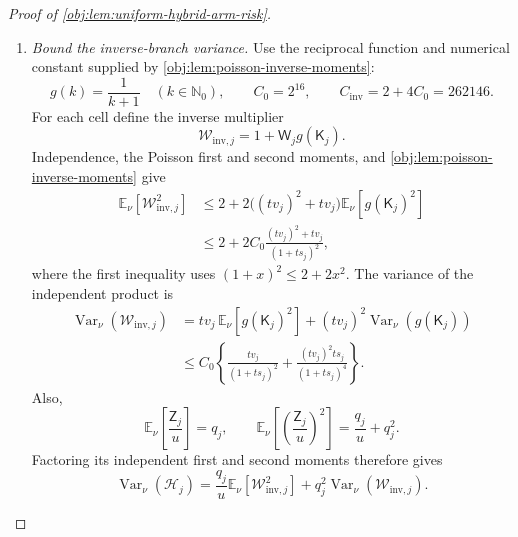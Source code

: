 \documentclass[11pt]{article}
\begin{document}
\begin{proof}[Proof of \cref{obj:lem:uniform-hybrid-arm-risk}]
\begin{enumerate}
\item \textit{Bound the inverse-branch variance.}
Use the reciprocal function and numerical constant supplied by
\cref{obj:lem:poisson-inverse-moments}:
\[
g(k)=\frac1{k+1}\quad(k\in\mathbb N_0),
\qquad
C_0=2^{16},
\qquad
C_{\mathrm{inv}}=2+4C_0=262146.
\]
For each cell define the inverse multiplier
\[
\mathcal W_{\mathrm{inv},j}
=1+\mathsf W_jg(\mathsf K_j).
\]
Independence, the Poisson first and second moments, and
\cref{obj:lem:poisson-inverse-moments} give
\[
\begin{aligned}
\mathbb E_\nu[\mathcal W_{\mathrm{inv},j}^2]
&\le
2+2\bigl((tv_j)^2+tv_j\bigr)
\mathbb E_\nu[g(\mathsf K_j)^2]\\
&\le
2+2C_0\frac{(tv_j)^2+tv_j}{(1+ts_j)^2},
\end{aligned}
\]
where the first inequality uses \((1+x)^2\le2+2x^2\). The variance of the independent product is
\[
\begin{aligned}
\operatorname{Var}_\nu(\mathcal W_{\mathrm{inv},j})
&=tv_j\,\mathbb E_\nu[g(\mathsf K_j)^2]
+(tv_j)^2\operatorname{Var}_\nu(g(\mathsf K_j))\\
&\le C_0\left\{
\frac{tv_j}{(1+ts_j)^2}
+\frac{(tv_j)^2ts_j}{(1+ts_j)^4}
\right\}.
\end{aligned}
\]
Also,
\[
\mathbb E_\nu\!\left[\frac{\mathsf Z_j}{u}\right]=q_j,
\qquad
\mathbb E_\nu\!\left[\left(\frac{\mathsf Z_j}{u}\right)^2\right]
=\frac{q_j}{u}+q_j^2.
\]
Factoring its independent first and second moments therefore gives
\[
\operatorname{Var}_\nu(\mathcal H_j)
=
\frac{q_j}{u}\mathbb E_\nu[\mathcal W_{\mathrm{inv},j}^2]
+q_j^2\operatorname{Var}_\nu(\mathcal W_{\mathrm{inv},j}).
\]


\end{enumerate}
\end{proof}
\end{document}

